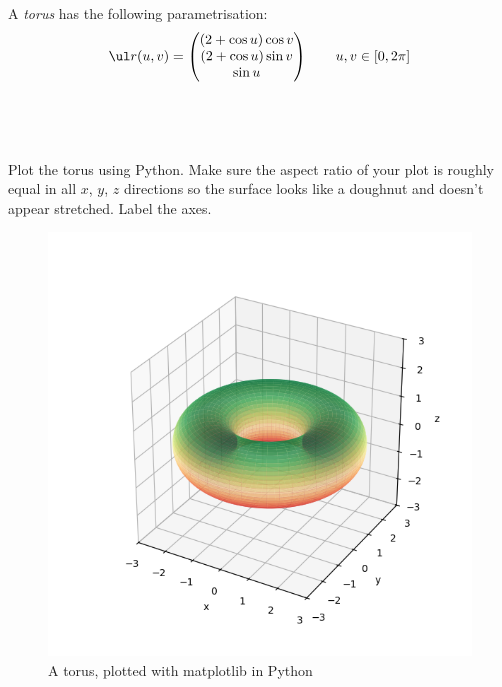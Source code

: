 \documentclass[a4paper]{article}
\begin{document}


\begin{questionbody}
A \textit{torus} has the following parametrisation: \[
\ul r(u, v) = \begin{pmatrix}
(2 + \cos u) \cos v \\
(2 + \cos u) \sin v \\
\sin u
\end{pmatrix} \qquad u, v \in [0, 2\pi]
\]
\end{questionbody}

\subsection{~} %

\begin{questionbody}
Plot the torus using Python. Make sure the aspect ratio of your plot is roughly equal in all $x$, $y$, $z$ directions so the surface looks like a doughnut and doesn't appear stretched. Label the axes.
\end{questionbody}

\begin{figure}[h]
	\centering
	\includegraphics[scale=0.8]{Q3a-torus}
	\caption{A torus, plotted with matplotlib in Python}
	\label{fig:torus-plot}
\end{figure}
\end{document}
